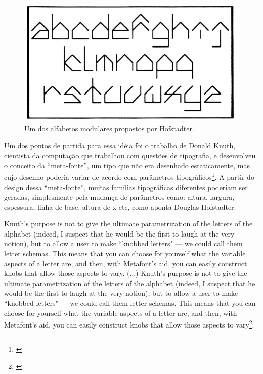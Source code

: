 \begin{figure}
    
        \includegraphics[width=1\linewidth]{pictures/metamagical}
        \vspace{-10pt}
    \caption{Um dos alfabetos modulares propostos por Hofstadter.}
    \label{fig:metamagical}
\end{figure} 

Um dos pontos de partida para essa idéia foi o trabalho de Donald Knuth, cientista da computação que trabalhou com questões de tipografia, e desenvolveu o conceito da ``meta-fonte'', um tipo que não era desenhado estaticamente, mas cujo desenho poderia variar de acordo com parâmetros tipográficos\footnote{\cite{knuth-meta-font_1982}}. A partir do design dessa ``meta-fonte'', muitas famílias tipográficas diferentes poderiam ser geradas, simplesmente pela mudança de parâmetros como: altura, largura, espessura, linha de base, altura de x etc, como aponta Douglas Hofstadter: 

\begin{citacao}{}
Knuth's purpose is not to give the ultimate parametrization of the letters of the alphabet (indeed, I suspect that he would be the first to laugh at the very notion), but to allow a user to make ``knobbed letters" --- we could call them letter schemas. This means that you can choose for yourself what the variable aspects of a letter are, and then, with Metafont's aid, you can easily construct knobs that allow those aspects to vary. 
(...)
Knuth's purpose is not to give the ultimate parametrization of the letters of the alphabet (indeed, I suspect that he would be the first to laugh at the very notion), but to allow a user to make ``knobbed letters" --- we could call them letter schemas. This means that you can choose for yourself what the variable aspects of a letter are, and then, with Metafont's aid, you can easily construct knobs that allow those aspects to vary\footnote{\cite{Metamagical1986}}. 
\end{citacao}


